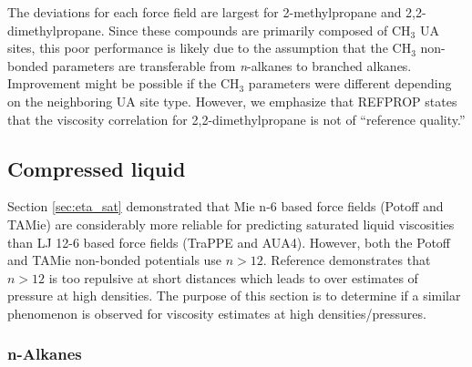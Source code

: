 \documentclass[preprint,review,12pt]{elsarticle}
\begin{document}
	
	The deviations for each force field are largest for 2-methylpropane and 2,2-dimethylpropane. Since these compounds are primarily composed of CH$_3$ UA sites, this poor performance is likely due to the assumption that the CH$_3$ non-bonded parameters are transferable from \textit{n}-alkanes to branched alkanes. Improvement might be possible if the CH$_3$ parameters were different depending on the neighboring UA site type. However, we emphasize that REFPROP states that the viscosity correlation for 2,2-dimethylpropane is not of ``reference quality.''
	
	\subsection{Compressed liquid} \label{sec:T293highP}
	
	Section \ref{sec:eta_sat} demonstrated that Mie n-6 based force fields (Potoff and TAMie) are considerably more reliable for predicting saturated liquid viscosities than LJ 12-6 based force fields (TraPPE and AUA4). However, both the Potoff and TAMie non-bonded potentials use $n > 12$. Reference  demonstrates that $n > 12$ is too repulsive at short distances which leads to over estimates of pressure at high densities. The purpose of this section is to determine if a similar phenomenon is observed for viscosity estimates at high densities/pressures.
	
	\subsubsection{n-Alkanes}
	
	
	
\end{document}
